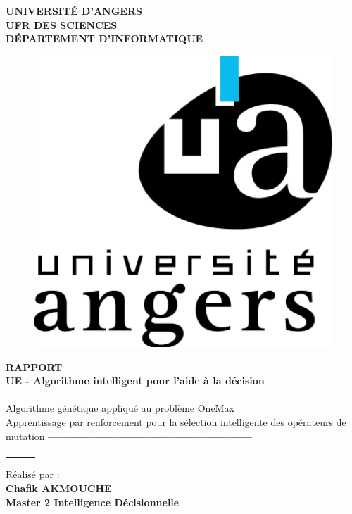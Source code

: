 \documentclass[12pt]{article}
\begin{document}
\thispagestyle{empty}
\begin{center}
\textbf{UNIVERSITÉ D'ANGERS}\\
\textbf{UFR DES SCIENCES}\\
\textbf{DÉPARTEMENT D'INFORMATIQUE}
\end{center}

\begin{figure}[H]
\begin{center}
\includegraphics[scale=0.23]{img/angers.png}
\end{center}
\end{figure}

\begin{center}
\Large{\textbf{RAPPORT}}\\
\Large{\textbf{UE - Algorithme intelligent pour l'aide à la décision}}\\


\textbf{------------------------------------------------------} \\
Algorithme génétique appliqué au problème OneMax  \\
Apprentissage par renforcement pour la sélection intelligente des opérateurs de mutation
\textbf{------------------------------------------------------} \\

\begin{table}[H]
\begin{tabular}{lll}
&&\\
\end{tabular}
\end{table}

Réalisé par :\\
\textbf{Chafik AKMOUCHE} \\

\textbf{Master 2 Intelligence Décisionnelle} \\
\end{center}
\end{document}
